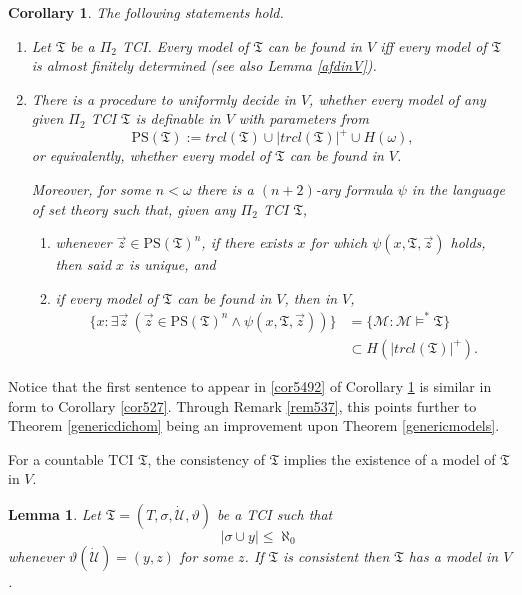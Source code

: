 \documentclass[12pt, twoside]{memoir}
\numberwithin{equation}{section}
\newtheorem{lem}[thm]{Lemma}
\newtheorem{cor}[thm]{Corollary}
\theoremstyle{definition}
\theoremstyle{remark}
\theoremstyle{definition}
\theoremstyle{definition}
\theoremstyle{definition}
\theoremstyle{remark}
\begin{document}
\begin{cor}\label{cor549}
The following statements hold.
\begin{enumerate}[label=(\arabic*)]
    \item Let $\mathfrak{T}$ be a $\Pi_2$ TCI. Every model of $\mathfrak{T}$ can be found in $V$ iff every model of $\mathfrak{T}$ is almost finitely determined (see also Lemma \ref{afdinV}).
    \item\label{cor5492} There is a procedure to uniformly decide in $V$, whether every model of any given $\Pi_2$ TCI $\mathfrak{T}$ is definable in $V$ with parameters from $$\mathrm{PS}(\mathfrak{T}) := trcl(\mathfrak{T}) \cup |trcl(\mathfrak{T})|^+ \cup H(\omega) \text{,}$$ or equivalently, whether every model of $\mathfrak{T}$ can be found in $V$.
    
    Moreover, for some $n < \omega$ there is a $(n+2)$-ary formula $\psi$ in the language of set theory such that, given any $\Pi_2$ TCI $\mathfrak{T}$,
    \begin{enumerate}[label=(\alph*)]
        \item whenever $\Vec{z} \in \mathrm{PS}(\mathfrak{T})^n$, if there exists $x$ for which $\psi(x, \mathfrak{T}, \Vec{z})$ holds, then said $x$ is unique, and
        \item if every model of $\mathfrak{T}$ can be found in $V$, then in $V$, 
        \begin{align*}
            \{x : \exists \Vec{z} \ (\Vec{z} \in \mathrm{PS}(\mathfrak{T})^n \wedge \psi(x, \mathfrak{T}, \Vec{z}))\} & = \{\mathcal{M} : \mathcal{M} \models^* \mathfrak{T}\} \\
            & \subset H(|trcl(\mathfrak{T})|^+) \text{.}
        \end{align*}
    \end{enumerate}
\end{enumerate}
\end{cor}
Notice that the first sentence to appear in \ref{cor5492} of Corollary \ref{cor549} is similar in form to Corollary \ref{cor527}. Through Remark \ref{rem537}, this points further to Theorem \ref{genericdichom} being an improvement upon Theorem \ref{genericmodels}. 

For a countable TCI $\mathfrak{T}$, the consistency of $\mathfrak{T}$ implies the existence of a model of $\mathfrak{T}$ in $V$. 

\begin{lem}\label{modelinV}
Let $\mathfrak{T} = (T, \sigma, \dot{\mathcal{U}}, \vartheta)$ be a TCI such that $$|\sigma \cup y| \leq \aleph_0$$ whenever $\vartheta(\dot{\mathcal{U}}) = (y, z)$ for some $z$. If $\mathfrak{T}$ is consistent then $\mathfrak{T}$ has a model in $V$.
\end{lem}
\end{document}
